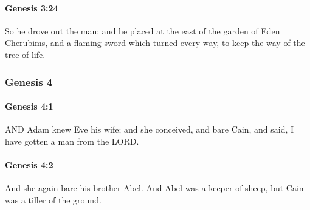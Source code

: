 		\paragraph{Genesis 3:24} %
			\label{GENESIS-3-24}

			So he drove out the man; and he placed at the east of the garden of Eden Cherubims, and a flaming sword which turned every way, to keep the way of the tree of life.


	\subsubsection{Genesis 4} %
		\label{GENESIS-4}
		
		\paragraph{Genesis 4:1} %
			\label{GENESIS-4-1}

			AND Adam knew Eve his wife; and she conceived, and bare Cain, and said, I have gotten a man from the LORD.


		\paragraph{Genesis 4:2} %
			\label{GENESIS-4-2}

			And she again bare his brother Abel.  And Abel was a keeper of sheep, but Cain was a tiller of the ground.

